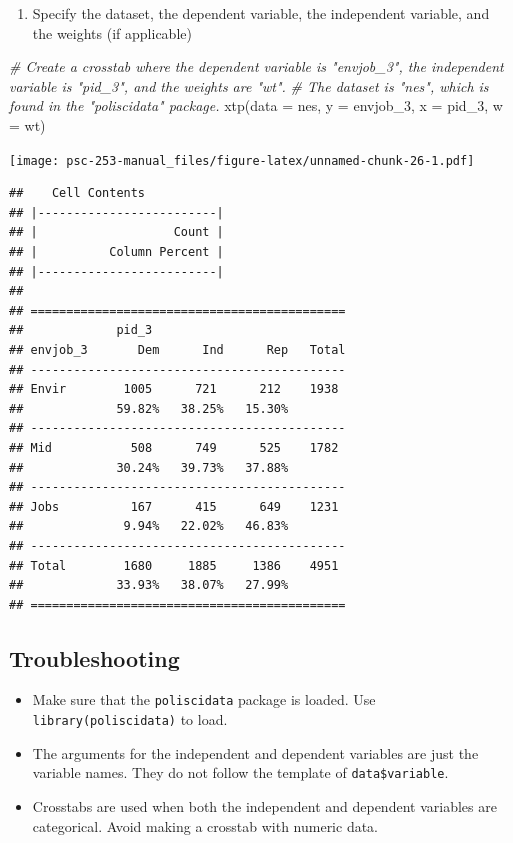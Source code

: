 \documentclass[
]{book}
\newenvironment{Shaded}{\begin{snugshade}}{\end{snugshade}}
\newcommand{\AttributeTok}[1]{\textcolor[rgb]{0.77,0.63,0.00}{#1}}
\newcommand{\CommentTok}[1]{\textcolor[rgb]{0.56,0.35,0.01}{\textit{#1}}}
\newcommand{\FunctionTok}[1]{\textcolor[rgb]{0.00,0.00,0.00}{#1}}
\newcommand{\NormalTok}[1]{#1}
\providecommand{\tightlist}{%
  \setlength{\itemsep}{0pt}\setlength{\parskip}{0pt}}
\begin{document}
\begin{enumerate}
\def\labelenumi{\arabic{enumi}.}
\tightlist
\item
  Specify the dataset, the dependent variable, the independent variable, and the weights (if applicable)
\end{enumerate}

\begin{Shaded}
\begin{Highlighting}[]
\CommentTok{\# Create a crosstab where the dependent variable is "envjob\_3", the independent variable is "pid\_3", and the weights are "wt".}
\CommentTok{\# The dataset is "nes", which is found in the "poliscidata" package.}
\FunctionTok{xtp}\NormalTok{(}\AttributeTok{data =}\NormalTok{ nes, }\AttributeTok{y =}\NormalTok{ envjob\_3, }\AttributeTok{x =}\NormalTok{ pid\_3, }\AttributeTok{w =}\NormalTok{ wt)}
\end{Highlighting}
\end{Shaded}

\texttt{[image: psc-253-manual\_files/figure-latex/unnamed-chunk-26-1.pdf]}

\begin{verbatim}
##    Cell Contents 
## |-------------------------|
## |                   Count | 
## |          Column Percent | 
## |-------------------------|
## 
## ============================================
##             pid_3
## envjob_3       Dem      Ind      Rep   Total
## --------------------------------------------
## Envir        1005      721      212    1938 
##             59.82%   38.25%   15.30%        
## --------------------------------------------
## Mid           508      749      525    1782 
##             30.24%   39.73%   37.88%        
## --------------------------------------------
## Jobs          167      415      649    1231 
##              9.94%   22.02%   46.83%        
## --------------------------------------------
## Total        1680     1885     1386    4951 
##             33.93%   38.07%   27.99%        
## ============================================
\end{verbatim}

\hypertarget{troubleshooting-9}{%
\subsection{Troubleshooting}\label{troubleshooting-9}}

\begin{itemize}
\tightlist
\item
  Make sure that the \texttt{poliscidata} package is loaded. Use \texttt{library(poliscidata)} to load.
\item
  The arguments for the independent and dependent variables are just the variable names. They do not follow the template of \texttt{data\$variable}.
\item
  Crosstabs are used when both the independent and dependent variables are categorical. Avoid making a crosstab with numeric data.
\end{itemize}
\end{document}
